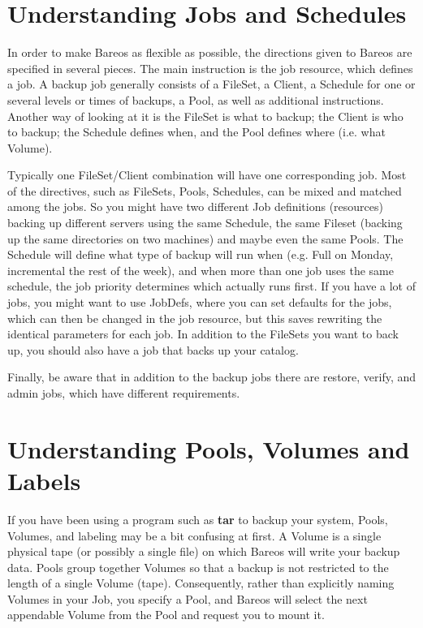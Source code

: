 \section{Understanding Jobs and Schedules}
\label{JobsandSchedules}

In order to make Bareos as flexible as possible, the directions given
to Bareos are specified in several pieces.  The main instruction is the
job resource, which defines a job.  A backup job generally consists of a
FileSet, a Client, a Schedule for one or several levels or times of backups,
a Pool, as well as additional instructions. Another way of looking
at it is the FileSet is what to backup; the Client is who to backup; the
Schedule defines when, and the Pool defines where (i.e. what Volume).

Typically one FileSet/Client combination will have one corresponding job.
Most of the directives, such as FileSets, Pools, Schedules, can be mixed
and matched among the jobs.  So you might have two different Job
definitions (resources) backing up different servers using the same
Schedule, the same Fileset (backing up the same directories on two machines)
and maybe even the same Pools.  The Schedule will define what type of
backup will run when (e.g. Full on Monday, incremental the rest of the
week), and when more than one job uses the same schedule, the job priority
determines which actually runs first.  If you have a lot of jobs, you might
want to use JobDefs, where you can set defaults for the jobs, which can
then be changed in the job resource, but this saves rewriting the
identical parameters for each job.  In addition to the FileSets you want to
back up, you should also have a job that backs up your catalog.

Finally, be aware that in addition to the backup jobs there are
restore, verify, and admin jobs, which have different requirements.

\section{Understanding Pools, Volumes and Labels}
\label{PoolsVolsLabels}

If you have been using a program such as {\bf tar} to backup your system,
Pools, Volumes, and labeling may be a bit confusing at first. A Volume is a
single physical tape (or possibly a single file) on which Bareos will write
your backup data. Pools group together Volumes so that a backup is not
restricted to the length of a single Volume (tape). Consequently, rather than
explicitly naming Volumes in your Job, you specify a Pool, and Bareos will
select the next appendable Volume from the Pool and request you to mount it.

